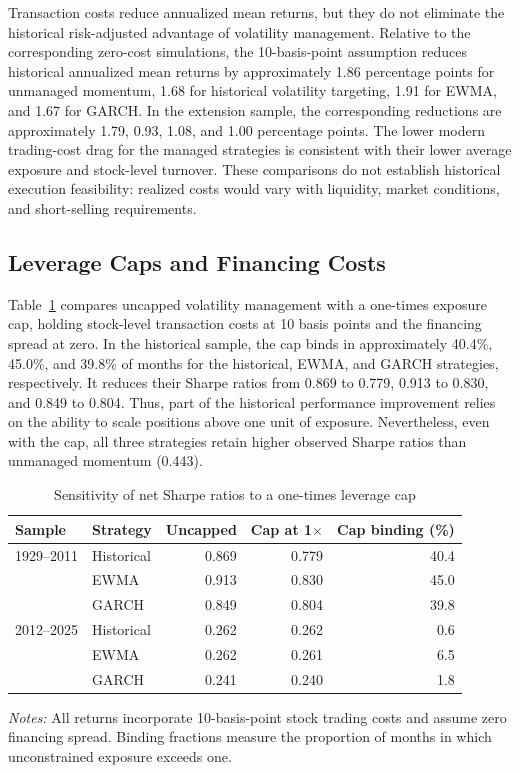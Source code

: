 \documentclass[11pt]{article}
\begin{document}
Transaction costs reduce annualized mean returns, but they do not eliminate the historical risk-adjusted advantage of volatility management. Relative to the corresponding zero-cost simulations, the 10-basis-point assumption reduces historical annualized mean returns by approximately 1.86 percentage points for unmanaged momentum, 1.68 for historical volatility targeting, 1.91 for EWMA, and 1.67 for GARCH. In the extension sample, the corresponding reductions are approximately 1.79, 0.93, 1.08, and 1.00 percentage points. The lower modern trading-cost drag for the managed strategies is consistent with their lower average exposure and stock-level turnover. These comparisons do not establish historical execution feasibility: realized costs would vary with liquidity, market conditions, and short-selling requirements.

\subsection{Leverage Caps and Financing Costs}
\label{sec:leverage_results}
Table~\ref{tab:leverage_caps} compares uncapped volatility management with a one-times exposure cap, holding stock-level transaction costs at 10 basis points and the financing spread at zero. In the historical sample, the cap binds in approximately 40.4\%, 45.0\%, and 39.8\% of months for the historical, EWMA, and GARCH strategies, respectively. It reduces their Sharpe ratios from 0.869 to 0.779, 0.913 to 0.830, and 0.849 to 0.804. Thus, part of the historical performance improvement relies on the ability to scale positions above one unit of exposure. Nevertheless, even with the cap, all three strategies retain higher observed Sharpe ratios than unmanaged momentum (0.443).

\begin{table}[htbp]
\centering
\caption{Sensitivity of net Sharpe ratios to a one-times leverage cap}
\label{tab:leverage_caps}
\small
\begin{tabular}{llrrr}
\hline
Sample & Strategy & Uncapped & Cap at 1$\times$ & Cap binding (\%) \\
\hline
1929--2011 & Historical & 0.869 & 0.779 & 40.4 \\
 & EWMA & 0.913 & 0.830 & 45.0 \\
 & GARCH & 0.849 & 0.804 & 39.8 \\
\hline
2012--2025 & Historical & 0.262 & 0.262 & 0.6 \\
 & EWMA & 0.262 & 0.261 & 6.5 \\
 & GARCH & 0.241 & 0.240 & 1.8 \\
\hline
\end{tabular}
\begin{minipage}{0.94\linewidth}\footnotesize\emph{Notes:} All returns incorporate 10-basis-point stock trading costs and assume zero financing spread. Binding fractions measure the proportion of months in which unconstrained exposure exceeds one.\end{minipage}
\end{table}
\end{document}
